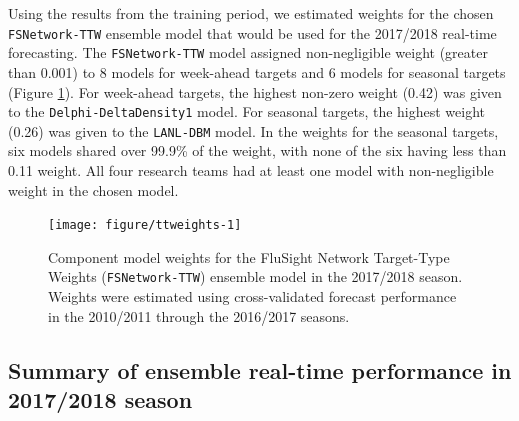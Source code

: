 \documentclass{article}\usepackage[]{graphicx}\usepackage[]{color}
\newenvironment{knitrout}{}{} %
\begin{document}
Using the results from the training period, we estimated weights for the chosen {\tt FSNetwork-TTW} ensemble model that would be used for the 2017/2018 real-time forecasting.
The {\tt FSNetwork-TTW} model assigned non-negligible weight (greater than 0.001) to 8 models for week-ahead targets and 6 models for seasonal targets (Figure \ref{fig:ttweights}).
For week-ahead targets, the highest non-zero weight 
(0.42) 
was given to the {\tt Delphi-DeltaDensity1} model.
For seasonal targets, the highest weight 
(0.26) 
was given to the {\tt LANL-DBM} model.
In the weights for the seasonal targets, six models shared over 99.9\% of the weight, with none of the six having less than 0.11 weight.
All four research teams had at least one model with non-negligible weight in the chosen model. 

\begin{knitrout}
\color{fgcolor}\begin{figure}
\texttt{[image: figure/ttweights-1]} \caption[Component model weights for the FluSight Network Target-Type Weights ({\tt FSNetwork-TTW}) ensemble model in the 2017/2018 season]{Component model weights for the FluSight Network Target-Type Weights ({\tt FSNetwork-TTW}) ensemble model in the 2017/2018 season. Weights were estimated using cross-validated forecast performance in the 2010/2011 through the 2016/2017 seasons.}\label{fig:ttweights}
\end{figure}


\end{knitrout}





\subsection{Summary of ensemble real-time performance in 2017/2018 season}
\end{document}
